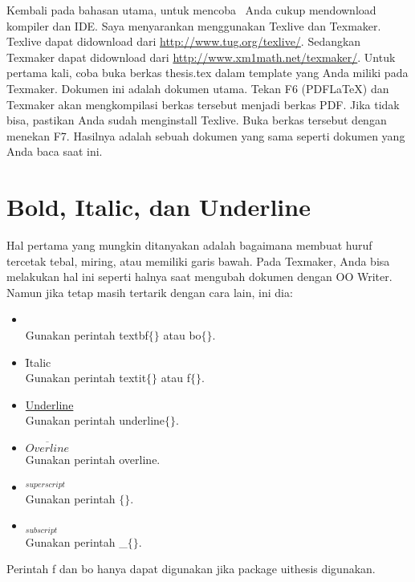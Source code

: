 Kembali pada bahasan utama, untuk mencoba \latex~Anda cukup mendownload 
kompiler dan IDE. Saya menyarankan menggunakan Texlive dan Texmaker. 
Texlive dapat didownload dari \url{http://www.tug.org/texlive/}. 
Sedangkan Texmaker dapat didownload dari 
\url{http://www.xm1math.net/texmaker/}. 
Untuk pertama kali, coba buka berkas thesis.tex dalam template yang Anda miliki 
pada Texmaker. 
Dokumen ini adalah dokumen utama. 
Tekan F6 (PDFLaTeX) dan Texmaker akan mengkompilasi berkas tersebut menjadi 
berkas PDF. 
Jika tidak bisa, pastikan Anda sudah menginstall Texlive. 
Buka berkas tersebut dengan menekan F7. 
Hasilnya adalah sebuah dokumen yang sama seperti dokumen yang Anda baca saat 
ini. 


\section{Bold, Italic, dan Underline}
Hal pertama yang mungkin ditanyakan adalah bagaimana membuat huruf tercetak 
tebal, miring, atau memiliki garis bawah. 
Pada Texmaker, Anda bisa melakukan hal ini seperti halnya saat mengubah dokumen 
dengan OO Writer. 
Namun jika tetap masih tertarik dengan cara lain, ini dia: 

\begin{itemize}
	\item {} \\
		Gunakan perintah \bslash textbf$\lbrace\rbrace$ atau 
		\bslash bo$\lbrace\rbrace$. 
	\item \f{Italic} \\
		Gunakan perintah \bslash textit$\lbrace\rbrace$ atau 
		\bslash f$\lbrace\rbrace$. 
	\item \underline{Underline} \\
		Gunakan perintah \bslash underline$\lbrace\rbrace$.
	\item $\overline{Overline}$ \\
		Gunakan perintah \bslash overline. 
	\item $^{superscript}$ \\
		Gunakan perintah \bslash $\lbrace\rbrace$. 
	\item $_{subscript}$ \\
		Gunakan perintah \bslash \_$\lbrace\rbrace$. 
\end{itemize}

Perintah \bslash f dan \bslash bo hanya dapat digunakan jika package 
uithesis digunakan. 


